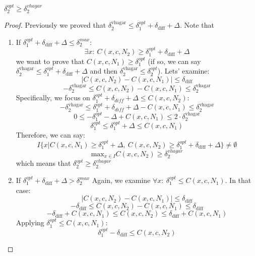 \begin{lemma}
$\delta_2^{opt} \geq \delta^{vhagar}_2$
\end{lemma}
\begin{proof}
Previously we proved that $\delta_2^{\text{vhagar}} \leq \delta_1^{opt}+\delta_{\text{diff}}+\Delta$.
Note that 
\\
\begin{enumerate}
    \item If $\delta_1^{opt}+\delta_{\text{diff}}+\Delta \leq \delta_2^{max}$:
    $$\exists{x}:\ C(x,c,N_2) \geq \delta_1^{opt}+\delta_{\text{diff}}+\Delta$$
    we want to prove that $C(x,c,N_1) \geq \delta_1^{opt}$ (if so, we can say $\delta_2^{\text{vhagar}} \leq  \delta_1^{opt}+\delta_{\text{diff}}+\Delta$ and then $\delta_2^{\text{vhagar}} \leq \delta_2^{opt}$). Lets' examine:
    $$|C(x,c,N_2)-C(x,c,N_1)| \leq \delta_{\text{diff}}$$
    $$ -\delta_2^{\text{vhagar}} \leq C(x,c,N_2)-C(x,c,N_1) \leq \delta_2^{\text{vhagar}} $$
    Specifically, we focus on $\delta_1^{opt}+\delta_{diff}+\Delta \leq C(x,c,N_2)$:
    $$  -\delta_2^{\text{vhagar}} \leq \delta_1^{opt}+\delta_{diff}+\Delta-C(x,c,N_1) \leq \delta_2^{\text{vhagar}} $$
    $$  0 \leq -\delta_1^{opt}-\Delta+C(x,c,N_1) \leq 2\cdot\delta_2^{\text{vhagar}} $$
    $$ \delta_1^{opt} \leq \delta_1^{opt} + \Delta \leq C(x,c,N_1) $$
    Therefore, we can say:
    $$I\{x| C(x,c,N_1)\geq\delta_1^{opt} + \Delta,\ C(x,c,N_2)\geq \delta_1^{opt}+\delta_{\text{diff}}+\Delta\}\ne\emptyset$$
    $$\text{max}_{x\in{I}}{C(x,c,N_2)} \geq \delta_2^{vhagar}$$
    which means that $\delta_2^{opt} \geq \delta_2^{vhagar}$
    
    \item If $\delta_1^{opt}+\delta_{\text{diff}}+\Delta > \delta_2^{max}$
    Again, we examine $\forall{x}:\ \delta_1^{opt} \leq C(x,c,N_1)$. In that case:
    $$|C(x,c,N_2)-C(x,c,N_1)| \leq \delta_{\text{diff}}$$
    $$-\delta_{\text{diff}} \leq C(x,c,N_2)-C(x,c,N_1) \leq \delta_{\text{diff}}$$
    $$-\delta_{\text{diff}}+C(x,c,N_1) \leq C(x,c,N_2) \leq \delta_{\text{diff}}+C(x,c,N_1)$$
    Applying $\delta_1^{opt} \leq C(x,c,N_1)$:
    $$\delta_1^{opt}-\delta_{\text{diff}} \leq C(x,c,N_2)$$
    

\end{enumerate}
\end{proof}

